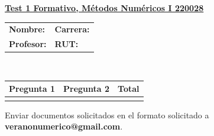 \documentclass[11pt]{article}
\begin{document}
\hspace*{-1,5cm}

\vspace*{0.5cm} \centerline {\bf\underline{Test 1 Formativo, M\'etodos Num\'ericos I 220028 }}


\begin{center}
 \begin{tabular}{p{}p{}}
	\textbf{Nombre:}   &\textbf{Carrera:}\\
	\textbf{Profesor:} & \textbf{ RUT:}
 \end{tabular}
 \\
 \vspace{0.2cm}
 \begin{tabular}{||p{2cm}|p{2cm}||p{2cm}||}
 \hline
 Pregunta 1 &  Pregunta 2  &     Total\\
 \hline

  \vspace{1.5cm} & &     \\
 \hline
 \end{tabular}
 \end{center}
 Enviar documentos solicitados en el formato solicitado a \textbf{veranonumerico@gmail.com}.
\end{document}
